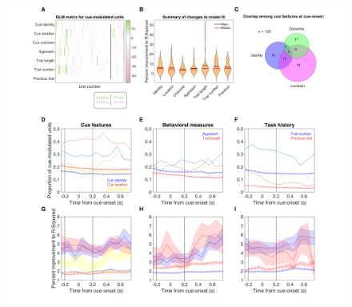 \documentclass[11pt]{article}
\begin{document}
\begin{figure}[h]
\centering
\includegraphics[width=\textwidth]{Fig 6 - GLM.png}

\end{figure}
\end{document}
